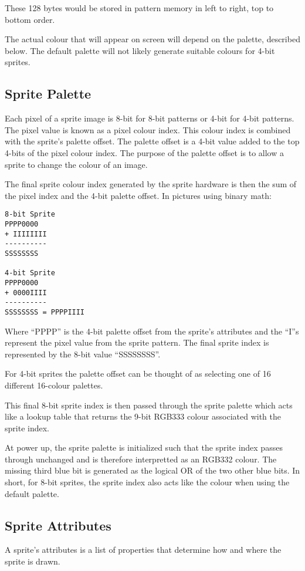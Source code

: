 These 128 bytes would be stored in pattern memory in left to right,
top to bottom order.

The actual colour that will appear on screen will depend on the
palette, described below. The default palette will not likely generate
suitable colours for 4-bit sprites.

\subsection{Sprite Palette}
Each pixel of a sprite image is 8-bit for 8-bit patterns or 4-bit for
4-bit patterns. The pixel value is known as a pixel colour index. This
colour index is combined with the sprite’s palette offset. The palette
offset is a 4-bit value added to the top 4-bits of the pixel colour
index. The purpose of the palette offset is to allow a sprite to
change the colour of an image.

The final sprite colour index generated by the sprite hardware is then
the sum of the pixel index and the 4-bit palette offset. In pictures
using binary math:

\begin{verbatim}
8-bit Sprite
PPPP0000
+ IIIIIIII
----------
SSSSSSSS

4-bit Sprite
PPPP0000
+ 0000IIII
----------
SSSSSSSS = PPPPIIII
\end{verbatim}

Where “PPPP” is the 4-bit palette offset from the sprite’s attributes
and the “I”s represent the pixel value from the sprite pattern. The
final sprite index is represented by the 8-bit value “SSSSSSSS”.

For 4-bit sprites the palette offset can be thought of as selecting
one of 16 different 16-colour palettes.

This final 8-bit sprite index is then passed through the sprite
palette which acts like a lookup table that returns the 9-bit RGB333
colour associated with the sprite index.

At power up, the sprite palette is initialized such that the sprite
index passes through unchanged and is therefore interpretted as an
RGB332 colour. The missing third blue bit is generated as the logical
OR of the two other blue bits. In short, for 8-bit sprites, the sprite
index also acts like the colour when using the default palette.

\subsection{Sprite Attributes}
A sprite’s attributes is a list of properties that determine how and
where the sprite is drawn.

